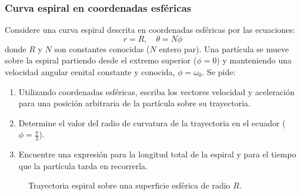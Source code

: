 \subsubsection{Curva espiral en coordenadas esféricas}

Considere una curva espiral descrita en coordenadas esféricas por las ecuaciones:
\[ r = R, \quad \theta = N\phi \]
donde $R$ y $N$ son constantes conocidas ($N$ entero par). Una partícula se mueve sobre la espiral partiendo desde el extremo superior ($\phi=0$) y manteniendo una velocidad angular cenital constante y conocida, $\dot{\phi} = \omega_0$. Se pide:

\begin{enumerate}
    \item Utilizando coordenadas esféricas, escriba los vectores velocidad y aceleración para una posición arbitraria de la partícula sobre su trayectoria.
    \item Determine el valor del radio de curvatura de la trayectoria en el ecuador ($\phi = \frac{\pi}{2}$).
    \item Encuentre una expresión para la longitud total de la espiral y para el tiempo que la partícula tarda en recorrerla.
\end{enumerate}

\begin{figure}[!ht]
    \centering
    \caption{Trayectoria espiral sobre una superficie esférica de radio $R$.}
\end{figure}